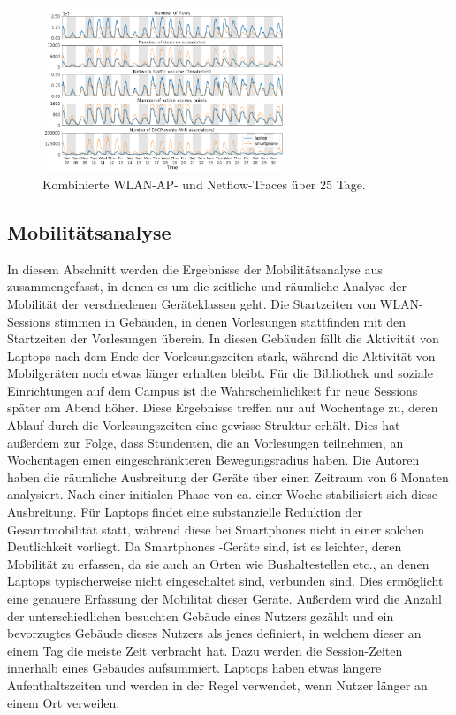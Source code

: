 \documentclass[12pt, a4paper]{article}
\begin{document}
\begin{figure}[H]
    \centering
    \includegraphics[width=0.65\textwidth]{img/traces.png}
    \caption{Kombinierte WLAN-AP- und Netflow-Traces über $25$ Tage. \cite{Alipour2018}}
    \label{fig:traces}
\end{figure}

\subsection{Mobilitätsanalyse}

In diesem Abschnitt werden die Ergebnisse der Mobilitätsanalyse aus \cite{Alipour2018} zusammengefasst, in denen es
um die zeitliche und räumliche Analyse der Mobilität der verschiedenen Geräteklassen geht.
Die Startzeiten von WLAN-Sessions stimmen in Gebäuden, in denen Vorlesungen stattfinden mit den Startzeiten der Vorlesungen überein.
In diesen Gebäuden fällt die Aktivität von Laptops nach dem Ende der Vorlesungszeiten stark, während die Aktivität von Mobilgeräten
noch etwas länger erhalten bleibt. Für die Bibliothek und soziale Einrichtungen auf dem Campus ist die Wahrscheinlichkeit
für neue Sessions später am Abend höher. Diese Ergebnisse treffen nur auf Wochentage zu, deren Ablauf durch
die Vorlesungszeiten eine gewisse Struktur erhält.
Dies hat außerdem zur Folge, dass Stundenten, die an Vorlesungen teilnehmen, an Wochentagen einen eingeschränkteren Bewegungsradius haben.
Die Autoren haben die räumliche Ausbreitung der Geräte über einen Zeitraum von $6$ Monaten analysiert.
Nach einer initialen Phase von ca. einer Woche stabilisiert sich diese Ausbreitung. Für Laptops findet eine 
substanzielle Reduktion der Gesamtmobilität statt, während diese bei Smartphones nicht in einer solchen Deutlichkeit vorliegt.
Da Smartphones -Geräte sind, ist es leichter, deren Mobilität zu erfassen, da sie auch an Orten
wie Bushaltestellen etc., an denen Laptops typischerweise nicht eingeschaltet sind, verbunden sind.
Dies ermöglicht eine genauere Erfassung der Mobilität dieser Geräte.
Außerdem wird die Anzahl der unterschiedlichen besuchten Gebäude eines Nutzers gezählt und ein bevorzugtes
Gebäude dieses Nutzers als jenes definiert, in welchem dieser an einem Tag die meiste Zeit verbracht hat.
Dazu werden die Session-Zeiten innerhalb eines Gebäudes aufsummiert.
Laptops haben etwas längere Aufenthaltszeiten und werden in der Regel verwendet, wenn Nutzer länger an einem Ort verweilen.
\end{document}
